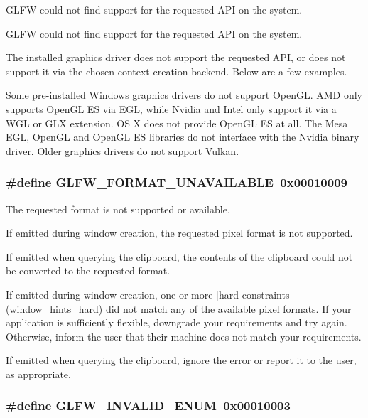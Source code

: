 GLFW could not find support for the requested API on the system. 

GLFW could not find support for the requested API on the system.

The installed graphics driver does not support the requested API, or does not support it via the chosen context creation backend. Below are a few examples.

\begin{Desc}
\item[]Some pre-installed Windows graphics drivers do not support OpenGL. AMD only supports OpenGL ES via EGL, while Nvidia and Intel only support it via a WGL or GLX extension. OS X does not provide OpenGL ES at all. The Mesa EGL, OpenGL and OpenGL ES libraries do not interface with the Nvidia binary driver. Older graphics drivers do not support Vulkan. \end{Desc}
\hypertarget{group__errors_g196e125ef261d94184e2b55c05762f14}{
\subsubsection[GLFW\_\-FORMAT\_\-UNAVAILABLE]{\setlength{\rightskip}{0pt plus 5cm}\#define GLFW\_\-FORMAT\_\-UNAVAILABLE~0x00010009}}
\label{group__errors_g196e125ef261d94184e2b55c05762f14}


The requested format is not supported or available. 

If emitted during window creation, the requested pixel format is not supported.

If emitted when querying the clipboard, the contents of the clipboard could not be converted to the requested format.

If emitted during window creation, one or more \mbox{[}hard constraints\mbox{]}(window\_\-hints\_\-hard) did not match any of the available pixel formats. If your application is sufficiently flexible, downgrade your requirements and try again. Otherwise, inform the user that their machine does not match your requirements.

\begin{Desc}
\item[]If emitted when querying the clipboard, ignore the error or report it to the user, as appropriate. \end{Desc}
\hypertarget{group__errors_g76f6bb9c4eea73db675f096b404593ce}{
\subsubsection[GLFW\_\-INVALID\_\-ENUM]{\setlength{\rightskip}{0pt plus 5cm}\#define GLFW\_\-INVALID\_\-ENUM~0x00010003}}
\label{group__errors_g76f6bb9c4eea73db675f096b404593ce}


